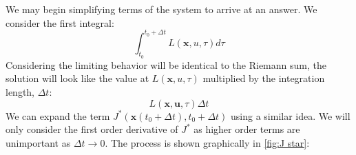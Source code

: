 We may begin simplifying terms of the system to arrive at an answer. We consider the first integral:
$$\int_{t_0}^{t_0+\Delta t}{L(\bm{x},u,\tau)d\tau}$$
Considering the limiting behavior will be identical to the Riemann sum, the solution will look like the value at $L(\bm{x},u,\tau)$ multiplied by the integration length, $\Delta t$:
$$L(\bm{x},\bm{u},\tau)\Delta t$$
We can expand the term $J^*(\bm{x}(t_0+\Delta t),t_0+\Delta t)$ using a similar idea. We will only consider the first order derivative of $J^*$ as higher order terms are unimportant as $\Delta t\rightarrow0$. The process is shown graphically in \autoref{fig:J star}:
